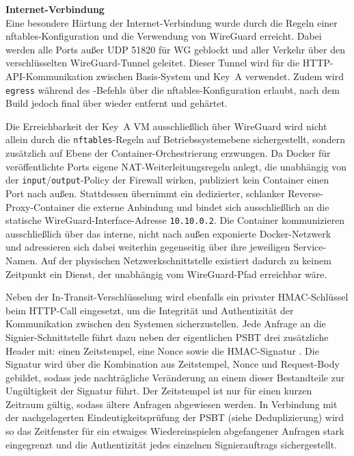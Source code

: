 \textbf{Internet-Verbindung} \\
Eine besondere Härtung der Internet-Verbindung wurde durch die Regeln einer nftables-Konfiguration und die Verwendung von WireGuard erreicht. Dabei werden alle Ports außer \ac{UDP} 51820 für \ac{WG} geblockt und aller Verkehr über den verschlüsselten WireGuard-Tunnel geleitet. Dieser Tunnel wird für die \ac{HTTP}-\ac{API}-Kommunikation zwischen Basis-System und Key~A verwendet.
Zudem wird \texttt{egress} während des \texttt{}-Befehls über die nftables-Konfiguration \texttt{} erlaubt, nach dem Build jedoch final über \texttt{} wieder entfernt und gehärtet.

Die Erreichbarkeit der Key~A \ac{VM} ausschließlich über WireGuard wird nicht allein durch die \texttt{nftables}-Regeln auf Betriebssystemebene sichergestellt, sondern zusätzlich auf Ebene der Container-Orchestrierung erzwungen. Da Docker für veröffentlichte Ports eigene \ac{NAT}-Weiterleitungsregeln anlegt, die unabhängig von der \texttt{input}/\texttt{output}-Policy der Firewall wirken, publiziert kein Container einen Port nach außen. Stattdessen übernimmt ein dedizierter, schlanker Reverse-Proxy-Container die externe Anbindung und bindet sich ausschließlich an die statische WireGuard-Interface-Adresse \texttt{10.10.0.2}. Die Container kommunizieren ausschließlich über das interne, nicht nach außen exponierte Docker-Netzwerk und adressieren sich dabei weiterhin gegenseitig über ihre jeweiligen Service-Namen. Auf der physischen Netzwerkschnittstelle existiert dadurch zu keinem Zeitpunkt ein Dienst, der unabhängig vom WireGuard-Pfad erreichbar wäre.

\label{sec:HMAC}
Neben der In-Transit-Verschlüsselung wird ebenfalls ein privater \ac{HMAC}-Schlüssel beim \ac{HTTP}-Call eingesetzt, um die Integrität und Authentizität der Kommunikation zwischen den Systemen sicherzustellen.
Jede Anfrage an die Signier-Schnittstelle führt dazu neben der eigentlichen \ac{PSBT} drei zusätzliche Header mit: einen Zeitstempel, eine Nonce sowie die \ac{HMAC}-Signatur \cite{HMAC, rfc2104}.
Die Signatur wird über die Kombination aus Zeitstempel, Nonce und Request-Body gebildet, sodass jede nachträgliche Veränderung an einem dieser Bestandteile zur Ungültigkeit der Signatur führt.
Der Zeitstempel ist nur für einen kurzen Zeitraum gültig, sodass ältere Anfragen abgewiesen werden. In Verbindung mit der nachgelagerten Eindeutigkeitsprüfung der \ac{PSBT} (siehe Deduplizierung) wird so das Zeitfenster für ein etwaiges Wiedereinspielen abgefangener Anfragen stark eingegrenzt und die Authentizität jedes einzelnen Signierauftrags sichergestellt.

